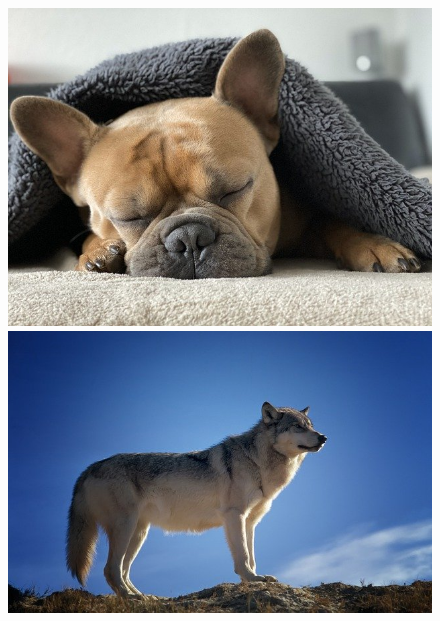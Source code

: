 \documentclass{article}
\begin{document}
	\begin{figure}
		\centering
		\begin{varwidth}[t]{\textwidth}
			\vspace{0pt}
			\includegraphics[scale=0.2]{snuggle.jpg}
		\end{varwidth}
		\begin{varwidth}[t]{\textwidth}
			\vspace{0pt}
			\includegraphics[scale=0.2]{wolf.jpg}
		\end{varwidth}
	\end{figure}
\end{document}
